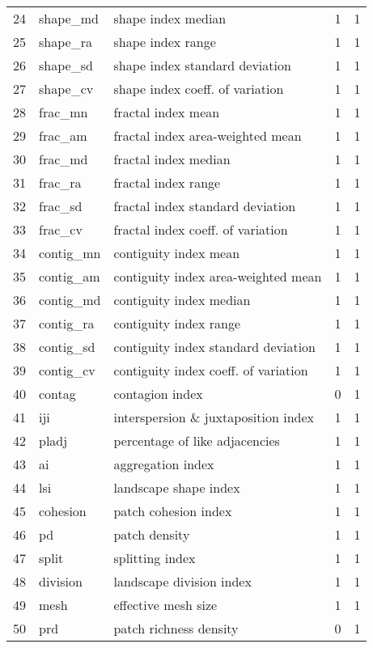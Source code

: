 \begin{longtable}{rllrr}
   24 & shape\_md & shape index median &   1 &   1 \\ 
   25 & shape\_ra & shape index range &   1 &   1 \\ 
   26 & shape\_sd & shape index standard deviation &   1 &   1 \\ 
   27 & shape\_cv & shape index coeff. of variation &   1 &   1 \\ 
   28 & frac\_mn & fractal index mean &   1 &   1 \\ 
   29 & frac\_am & fractal index area-weighted mean &   1 &   1 \\ 
   30 & frac\_md & fractal index median &   1 &   1 \\ 
   31 & frac\_ra & fractal index range &   1 &   1 \\ 
   32 & frac\_sd & fractal index standard deviation &   1 &   1 \\ 
   33 & frac\_cv & fractal index coeff. of variation &   1 &   1 \\ 
   34 & contig\_mn & contiguity index mean &   1 &   1 \\ 
   35 & contig\_am & contiguity index area-weighted mean &   1 &   1 \\ 
   36 & contig\_md & contiguity index median &   1 &   1 \\ 
   37 & contig\_ra & contiguity index range &   1 &   1 \\ 
   38 & contig\_sd & contiguity index standard deviation &   1 &   1 \\ 
   39 & contig\_cv & contiguity index coeff. of variation &   1 &   1 \\ 
   40 & contag & contagion index &   0 &   1 \\ 
   41 & iji & interspersion \& juxtaposition index &   1 &   1 \\ 
   42 & pladj & percentage of like adjacencies &   1 &   1 \\ 
   43 & ai & aggregation index &   1 &   1 \\ 
   44 & lsi & landscape shape index &   1 &   1 \\ 
   45 & cohesion & patch cohesion index &   1 &   1 \\ 
   46 & pd & patch density &   1 &   1 \\ 
   47 & split & splitting index &   1 &   1 \\ 
   48 & division & landscape division index &   1 &   1 \\ 
   49 & mesh & effective mesh size &   1 &   1 \\ 
   50 & prd & patch richness density &   0 &   1 \\ 

\end{longtable}
